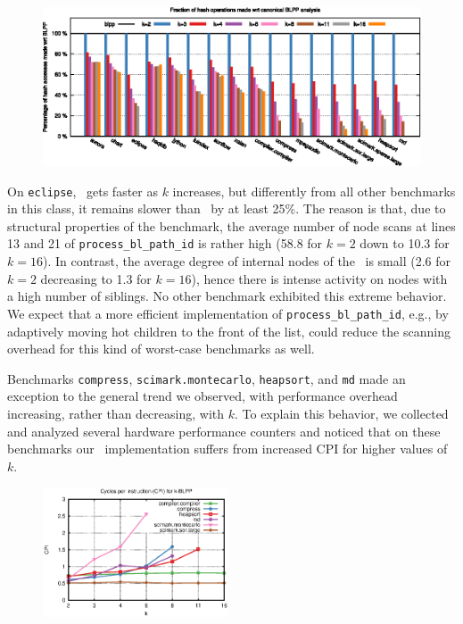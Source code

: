 \ifdefined\noauthorea
\begin{figure}[!ht]
\begin{center}
\includegraphics[width=\textwidth]{figures/kblpp-hash/kblpp-hash.eps}
\caption{\protect}
\end{center}
\end{figure}
\fi

On {\tt eclipse}, \kblpp\ gets faster as $k$ increases, but differently from all other benchmarks in this class, it remains slower than \blpp\ by at least 25\%. The reason is that, due to structural properties of the benchmark, the average number of node scans at lines 13 and 21 of {\tt process\_bl\_path\_id} is rather high (58.8 for $k=2$ down to 10.3 for $k=16$). In contrast, the average degree of internal nodes of the \ksf\ is small (2.6 for $k=2$ decreasing to 1.3 for $k=16$), hence there is intense activity on nodes with a high number of siblings. No other benchmark exhibited this extreme behavior. We expect that a more efficient implementation of {\tt process\_bl\_path\_id}, e.g., by adaptively moving hot children to the front of the list, could reduce the scanning overhead for this kind of worst-case benchmarks as well.

Benchmarks {\tt compress}, {\tt scimark.montecarlo}, {\tt heapsort}, and {\tt md} made an exception to the general trend we observed, with performance overhead increasing, rather than decreasing, with $k$. To explain this behavior, we collected and analyzed several hardware performance counters and noticed that on these benchmarks our \kblpp\ implementation suffers from increased CPI for higher values of $k$.

\ifdefined\noauthorea
\begin{figure}[!ht]
\begin{center}
\includegraphics[width=0.49\textwidth]{figures/kblpp-cpi/kblpp-cpi.eps}
\caption{\protect}
\end{center}
\end{figure}
\fi

